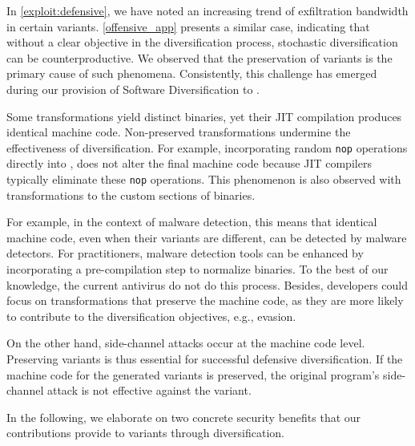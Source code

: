 \label{exploit:discussion_bad}

In \autoref{exploit:defensive}, we have noted an increasing trend of exfiltration bandwidth in certain variants. 
\autoref{offensive_app} presents a similar case, indicating that without a clear objective in the diversification process, stochastic diversification can be counterproductive. 
We observed that the preservation of variants is the primary cause of such phenomena. 
Consistently, this challenge has emerged during our provision of Software Diversification to \Wasm.


\begin{strategy}[Preservation]    
    Some transformations yield distinct \Wasm binaries, yet their JIT compilation produces identical machine code.
    Non-preserved transformations undermine the effectiveness of diversification.
    For example, incorporating random \texttt{nop} operations directly into \Wasm, does not alter the final machine code because JIT compilers typically eliminate these \texttt{nop} operations.
    This phenomenon is also observed with transformations to the custom sections of \Wasm binaries.
\end{strategy}


For example, in the context of \Wasm malware detection, this means that identical machine code, even when their \Wasm variants are different, can be detected by malware detectors.
For practitioners, malware detection tools can be enhanced by incorporating a pre-compilation step to normalize \Wasm binaries.
To the best of our knowledge, the current antivirus do not do this process.
Besides, developers could focus on transformations that preserve the machine code, as they are more likely to contribute to the diversification objectives, e.g., evasion.

On the other hand, side-channel attacks occur at the machine code level. 
Preserving \Wasm variants is thus essential for successful defensive diversification. 
If the machine code for the generated variants is preserved, the original \Wasm program's side-channel attack is not effective against the variant.

\label{exploit:discussion_good}

In the following, we elaborate on two concrete security benefits that our contributions provide to \Wasm variants through diversification.
 
